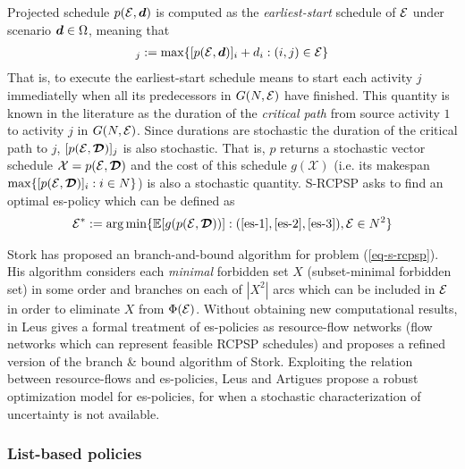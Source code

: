  	Projected schedule $p(\mathcal{E},\boldsymbol{d})$ is computed as the
 	\emph{earliest-start} schedule of $\mathcal{E}$ under scenario $\boldsymbol{d} \in \Omega$,
 	meaning that
 	\begin{align}
 		[p(\xE,\xd)]_j := \max \{ [p(\xE,\xd)]_i + d_i : (i,j) \in \xE\}
 	\end{align}
 	That is, to execute the earliest-start schedule means to start each activity $j$ 
 	immediatelly when all its predecessors in $G(N,\mathcal{E})$ have finished.
  	This quantity is known in the literature as the duration of the
 	\emph{critical path} from source activity $1$ to activity $j$ in $G(N,\mathcal{E})$.
 	Since durations are stochastic the duration of the critical path to $j$, 
 	$[p(\mathcal{E},\boldsymbol{\mathcal{D}})]_j$  is also stochastic.
 	That is, $p$ returns a stochastic vector schedule $\mathcal{X} = p(\mathcal{E},\boldsymbol{\mathcal{D}})$
 	and the cost of this schedule $g(\mathcal{X})$ 
 	(i.e. its makespan $\max\{[p(\mathcal{E},\boldsymbol{\mathcal{D}})]_i : i \in N\}$) is also a stochastic quantity.
 	S-RCPSP asks to find an optimal es-policy which can be defined as
 	\begin{align}
 		\mathcal{E}^* := \arg \min \{\mathbb{E}[g(p(\mathcal{E},\boldsymbol{\mathcal{D}}))] : (\ref{es-1},\ref{es-2},\ref{es-3}), \mathcal{E} \in N^2\}
 		\label{eq-s-rcpsp}
 	\end{align}
  	
	Stork \cite{stork2000branch} has proposed an branch-and-bound
	algorithm for problem (\ref{eq-s-rcpsp}).
	His algorithm considers each \emph{minimal} forbidden set $X$
	(subset-minimal forbidden set) in some order and branches
	on each of $|X^2|$ arcs which can be included in $\mathcal{E}$
	in order to eliminate $X$ from $\Phi(\mathcal{E})$.
	Without obtaining new computational results,
	in \cite{leus2011resource} Leus gives a formal treatment of
	es-policies as resource-flow networks
	(flow networks which can represent feasible RCPSP schedules) and
	proposes a refined version of the branch \& bound algorithm of Stork.
	Exploiting the relation between resource-flows and es-policies,
	Leus and Artigues \cite{leus2011robust} propose a 
	robust optimization model for es-policies,
	for when a stochastic characterization of uncertainty is not available.
	
	\subsubsection{List-based policies}
	
